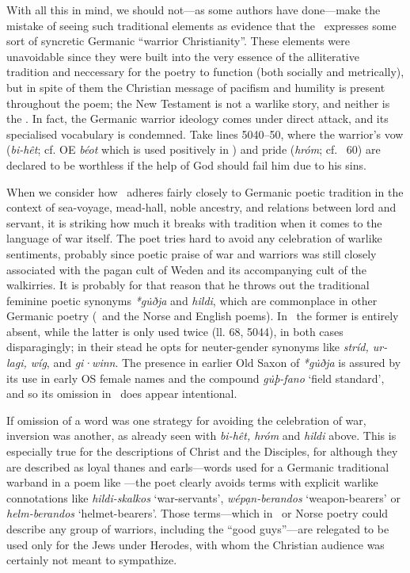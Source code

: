 With all this in mind, we should not—as some authors have done—make the mistake of seeing such traditional elements as evidence that the \Heliand\ expresses some sort of syncretic Germanic “warrior Christianity”.  These elements were unavoidable since they were built into the very essence of the alliterative tradition and neccessary for the poetry to function (both socially and metrically), but in spite of them the Christian message of pacifism and humility is present throughout the poem; the New Testament is not a warlike story, and neither is the \Heliand.  In fact, the Germanic warrior ideology comes under direct attack, and its specialised vocabulary is condemned.  Take lines 5040–50, where the warrior’s vow (\emph{bi-hêt}; cf. OE \emph{béot} which is used positively in \Beowulf) and pride (\emph{hróm}; cf. \Hildebrandslied\ 60) are declared to be worthless if the help of God should fail him due to his sins.

When we consider how \Heliand\ adheres fairly closely to Germanic poetic tradition in the context of sea-voyage, mead-hall, noble ancestry, and relations between lord and servant, it is striking how much it breaks with tradition when it comes to the language of war itself.  The poet tries hard to avoid any celebration of warlike sentiments, probably since poetic praise of war and warriors was still closely associated with the pagan cult of Weden and its accompanying cult of the walkirries.  It is probably for that reason that he throws out the traditional feminine poetic synonyms \emph{*gu̇ðja} and \emph{hildi}, which are commonplace in other Germanic poetry (\Hildebrandslied\ and the Norse and English poems).  In \Heliand\ the former is entirely absent, while the latter is only used twice (ll. 68, 5044), in both cases disparagingly; in their stead he opts for neuter-gender synonyms like \emph{stríd, ur-lagi, wíg}, and \emph{gi·winn}.  The presence in earlier Old Saxon of \emph{*gu̇ðja} is assured by its use in early OS female names and the compound \emph{gu̇þ-fano} ‘field standard’, and so its omission in \Heliand\ does appear intentional.

If omission of a word was one strategy for avoiding the celebration of war, inversion was another, as already seen with \emph{bi-hêt, hróm} and \emph{hildi} above.  This is especially true for the descriptions of Christ and the Disciples, for although they are described as loyal thanes and earls—words used for a Germanic traditional warband in a poem like \Beowulf—the poet clearly avoids terms with explicit warlike connotations like \emph{hildi-skalkos} ‘war-servants’, \emph{wépạn-berandos} ‘weapon-bearers’ or \emph{helm-berandos} ‘helmet-bearers’.  Those terms—which in \Beowulf\ or Norse poetry could describe any group of warriors, including the “good guys”—are relegated to be used only for the Jews under Herodes, with whom the Christian audience was certainly not meant to sympathize.

